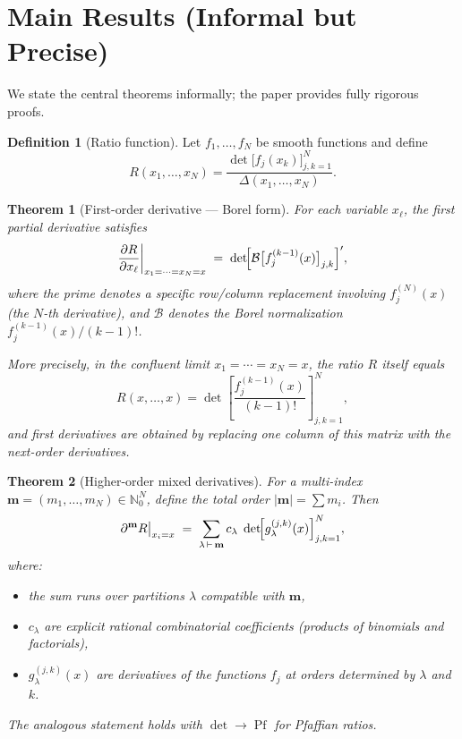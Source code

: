 \documentclass[11pt,a4paper]{article}
\newtheorem{theorem}{Theorem}
\theoremstyle{definition}
\newtheorem{definition}{Definition}
\begin{document}
\section{Main Results (Informal but Precise)}

We state the central theorems informally; the paper provides fully rigorous proofs.

\begin{definition}[Ratio function]
Let $f_1,\dots,f_N$ be smooth functions and define
\[
  R(x_1,\dots,x_N) = \frac{\det\bigl[f_j(x_k)\bigr]_{j,k=1}^{N}}{\Delta(x_1,\dots,x_N)}.
\]
\end{definition}

\begin{theorem}[First-order derivative --- Borel form]
\label{thm:first}
For each variable $x_\ell$, the first partial derivative satisfies
\[
  \frac{\partial R}{\partial x_\ell}\biggr|_{x_1=\cdots=x_N=x}
  \;=\;
  \det\!\Bigl[\mathcal{B}\bigl[f_j^{(k-1)}(x)\bigr]_{j,k}\Bigr]',
\]
where the prime denotes a specific row/column replacement involving $f_j^{(N)}(x)$ (the $N$-th derivative), and $\mathcal{B}$ denotes the Borel normalization $f_j^{(k-1)}(x)/(k-1)!$.

More precisely, in the confluent limit $x_1=\cdots=x_N=x$, the ratio $R$ itself equals
\[
  R(x,\dots,x) = \det\!\left[\frac{f_j^{(k-1)}(x)}{(k-1)!}\right]_{j,k=1}^{N},
\]
and first derivatives are obtained by replacing one column of this matrix with the next-order derivatives.
\end{theorem}

\begin{theorem}[Higher-order mixed derivatives]
\label{thm:higher}
For a multi-index $\mathbf{m}=(m_1,\dots,m_N)\in\mathbb{N}_0^N$, define the total order $|\mathbf{m}|=\sum m_i$.  Then
\[
  \partial^{\mathbf{m}} R\big|_{x_i=x}
  \;=\;
  \sum_{\lambda\,\vdash\,\mathbf{m}} c_\lambda\;\det\!\Bigl[g_\lambda^{(j,k)}(x)\Bigr]_{j,k=1}^{N},
\]
where:
\begin{itemize}[nosep]
  \item the sum runs over partitions $\lambda$ compatible with $\mathbf{m}$,
  \item $c_\lambda$ are explicit rational combinatorial coefficients (products of binomials and factorials),
  \item $g_\lambda^{(j,k)}(x)$ are derivatives of the functions $f_j$ at orders determined by $\lambda$ and $k$.
\end{itemize}
The analogous statement holds with $\det\to\operatorname{Pf}$ for Pfaffian ratios.
\end{theorem}
\end{document}
